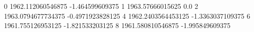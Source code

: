 0 1962.112060546875 -1.464599609375
1 1963.57666015625 0.0
2 1963.0794677734375 -0.4971923828125
4 1962.2403564453125 -1.3363037109375
6 1961.755126953125 -1.821533203125
8 1961.580810546875 -1.995849609375
